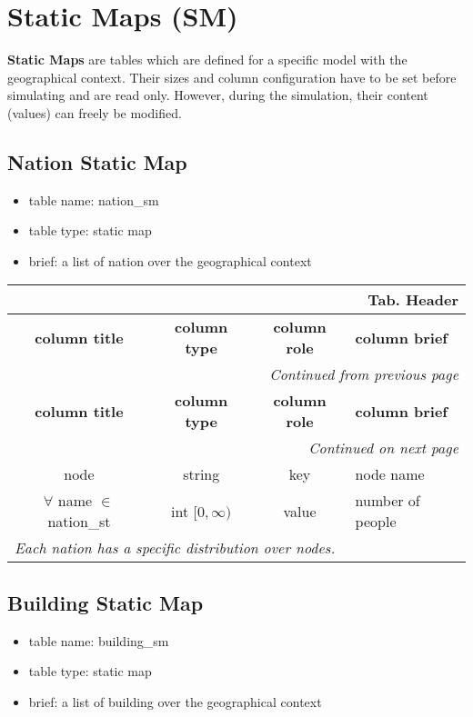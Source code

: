 \documentclass[a4paper,oneside,titlepage]{report}
\newcommand*{\LTHeaderIV}[5]{
  \multicolumn{4}{r}{\textbf{Tab. \thesubsection} \textbf{#1}}\\    
  \hline
  \textbf{#2} & \textbf{#3} & \textbf{#4} & \textbf{#5}\\
  \hline
  
  \endfirsthead
  \multicolumn{4}{r}{\textit{Continued from previous page}}\\    
  \hline
  \textbf{#2} & \textbf{#3} & \textbf{#4} & \textbf{#5}\\
  \hline
  \endhead
  \hline
  \multicolumn{4}{r}{\textit{Continued on next page}}\\
  \endfoot
  \hline
  \endlastfoot  
}
\begin{document}
\section{Static Maps (SM)}
\textbf{Static Maps} are tables which are defined for a specific model with the geographical context. Their sizes and column configuration have to be set before simulating and are read only. However, during the simulation, their content (values) can freely be modified.

\subsection{Nation Static Map}
\begin{itemize}
  \setlength{\itemsep}{0pt}
  \setlength{\parskip}{0pt}
\item table name: nation\_sm  
\item table type: static map  
\item brief: a list of nation over the geographical context
\end{itemize}

\begin{longtable}{ |c|c|c|l| } 
  \LTHeaderIV{Header}{column title}{column type}{column role}{column brief}                    
  node & string & key & node name\\
  $\forall$ name $\in$ nation\_st & int $[0, \infty)$ & value & number of people \\
  \multicolumn{4}{|l|}{\textit{Each nation has a specific distribution over nodes.}}\\
\end{longtable}        

\subsection{Building Static Map}
\begin{itemize}
  \setlength{\itemsep}{0pt}
  \setlength{\parskip}{0pt}
\item table name: building\_sm  
\item table type: static map  
\item brief: a list of building over the geographical context
\end{itemize}
\end{document}
